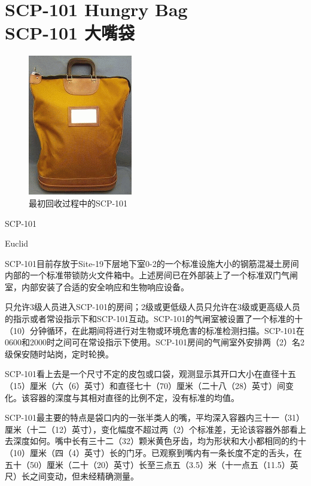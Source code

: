 \chapter[SCP-101 大嘴袋]{
    SCP-101 Hungry Bag\\
    SCP-101 大嘴袋
}

\label{chap:SCP-101}

\begin{figure}[H]
    \centering
    \includegraphics[max width=0.5\linewidth]{images/SCP.101.png}
    \caption*{最初回收过程中的SCP-101}
\end{figure}

SCP-101

Euclid

SCP-101目前存放于Site-19下层地下室0-2的一个标准设施大小的钢筋混凝土房间内部的一个标准带锁防火文件箱中。上述房间已在外部装上了一个标准双门气闸室，内部安装了合适的安全响应和生物响应设备。

只允许3级人员进入SCP-101的房间；2级或更低级人员只允许在3级或更高级人员的指示或者常设指示下和SCP-101互动。SCP-101的气闸室被设置了一个标准的十（10）分钟循环，在此期间将进行对生物或环境危害的标准检测扫描。SCP-101在0600和2000时之间可在常设指示下使用。SCP-101房间的气闸室外安排两（2）名2级保安随时站岗，定时轮换。

SCP-101看上去是一个尺寸不定的皮包或口袋，观测显示其开口大小在直径十五（15）厘米（六（6）英寸）和直径七十（70）厘米（二十八（28）英寸）间变化。该容器的深度与其相对直径的比例不定，没有标准的均值。

SCP-101最主要的特点是袋口内的一张半类人的嘴，平均深入容器内三十一（31）厘米（十二（12）英寸），变化幅度不超过两（2）个标准差，无论该容器外部看上去深度如何。嘴中长有三十二（32）颗米黄色牙齿，均为形状和大小都相同的约十（10）厘米（四（4）英寸）长的门牙。已观察到嘴内有一条长度不定的舌头，在五十（50）厘米（二十（20）英寸）长至三点五（3.5）米（十一点五（11.5）英尺）长之间变动，但未经精确测量。

